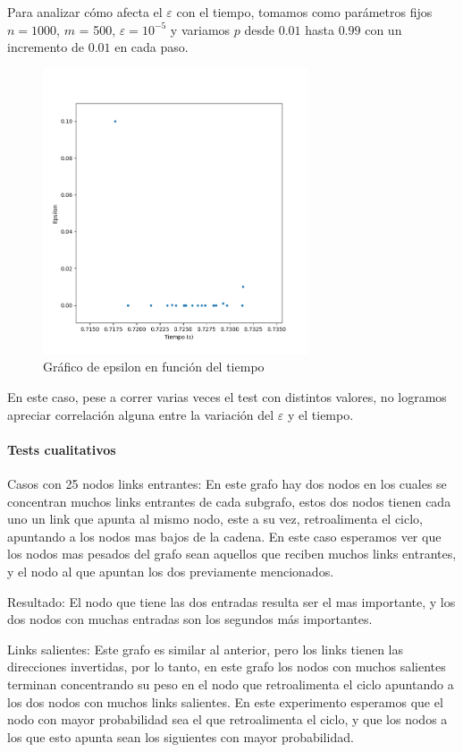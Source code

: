 Para analizar c\'omo afecta el $\varepsilon$ con el tiempo, tomamos como par\'ametros fijos $n = 1000$, $m$ = 500,
$\varepsilon = 10^{-5}$ y variamos $p$ desde $0.01$ hasta $0.99$ con un incremento de $0.01$ en cada paso.
\begin{figure}[H] 
\centering
\includegraphics[width=0.7\textwidth]{img/Eps.png}
\caption{Gr\'afico de epsilon en funci\'on del tiempo}
\label{fig:eps}
\end{figure}

En este caso, pese a correr varias veces el test con distintos valores, no logramos apreciar correlaci\'on alguna entre la variaci\'on del $\varepsilon$ y el
tiempo.

\paragraph{Tests cualitativos}

Casos con 25 nodos links entrantes: En este grafo hay dos nodos en los cuales se concentran muchos links entrantes de cada subgrafo, estos dos nodos tienen cada uno un link que apunta al mismo nodo, este a su vez, retroalimenta el ciclo, apuntando a los nodos mas bajos de la cadena.
En este caso esperamos ver que los nodos mas pesados del grafo sean aquellos que reciben muchos links entrantes, y el nodo al que apuntan los dos previamente mencionados.

Resultado: El nodo que tiene las dos entradas resulta ser el mas importante, y los dos nodos con muchas entradas son los segundos m\'as importantes. 

Links salientes: Este grafo es similar al anterior, pero los links tienen las direcciones invertidas, por lo tanto, en este grafo los nodos con muchos salientes terminan concentrando su peso en el nodo que retroalimenta el ciclo apuntando a los dos nodos con muchos links salientes.
En este experimento esperamos que el nodo con mayor probabilidad sea el que retroalimenta el ciclo, y que los nodos a los que esto apunta sean los siguientes con mayor probabilidad.

